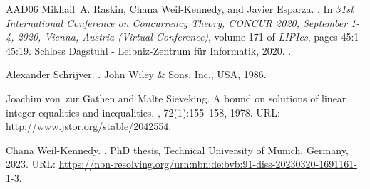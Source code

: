 \documentclass[11pt,a4paper]{amsart}
\theoremstyle{plain}
\theoremstyle{definition}
\theoremstyle{defC}
\theoremstyle{thmC}
\begin{document}
\begin{thebibliography}{AAD{\etalchar{+}}06}
Mikhail~A. Raskin, Chana Weil{-}Kennedy, and Javier Esparza.
.
\newblock In {\em 31st International Conference on Concurrency Theory, {CONCUR}
  2020, September 1-4, 2020, Vienna, Austria (Virtual Conference)}, volume 171
  of {\em LIPIcs}, pages 45:1--45:19. Schloss Dagstuhl - Leibniz-Zentrum
  f{\"{u}}r Informatik, 2020.
\newblock \href {https://doi.org/10.4230/LIPIcs.CONCUR.2020.45}
  {}.

Alexander Schrijver.
.
\newblock John Wiley \& Sons, Inc., USA, 1986.

Joachim von~zur Gathen and Malte Sieveking.
\newblock A bound on solutions of linear integer equalities and inequalities.
,
  72(1):155--158, 1978.
\newblock URL: \url{http://www.jstor.org/stable/2042554}.

Chana Weil{-}Kennedy.
.
\newblock PhD thesis, Technical University of Munich, Germany, 2023.
\newblock URL:
  \url{https://nbn-resolving.org/urn:nbn:de:bvb:91-diss-20230320-1691161-1-3}.

\end{thebibliography}
\end{document}
